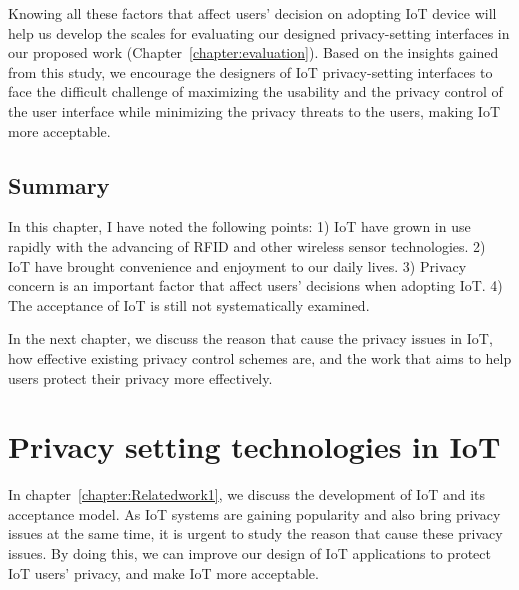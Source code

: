 Knowing all these factors that affect users' decision on adopting IoT device will help us develop the scales for evaluating our designed privacy-setting interfaces in our proposed work (Chapter~\ref{chapter:evaluation}). Based on the insights gained from this study, we encourage the designers of IoT privacy-setting interfaces to face the difficult challenge of maximizing the usability and the privacy control of the user interface while minimizing the privacy threats to the users, making IoT more acceptable.

\section{Summary}
In this chapter, I have noted the following points: 1) IoT have grown in use rapidly with the advancing of RFID and other wireless sensor technologies. 2) IoT have brought convenience and enjoyment to our daily lives. 3) Privacy concern is an important factor that affect users' decisions when adopting IoT. 4) The acceptance of IoT is still not systematically examined.


In the next chapter, we discuss the reason that cause the privacy issues in IoT, how effective existing privacy control schemes are, and the work that aims to help users protect their privacy more effectively.



















\chapter{Privacy setting technologies in IoT}\label{chapter:Relatedwork2}
In chapter~\ref{chapter:Relatedwork1}, we discuss the development of IoT and its acceptance model. As IoT systems are gaining popularity and also bring privacy issues at the same time, it is urgent to study the reason that cause these privacy issues. By doing this, we can improve our design of IoT applications to protect IoT users' privacy, and make IoT more acceptable.

